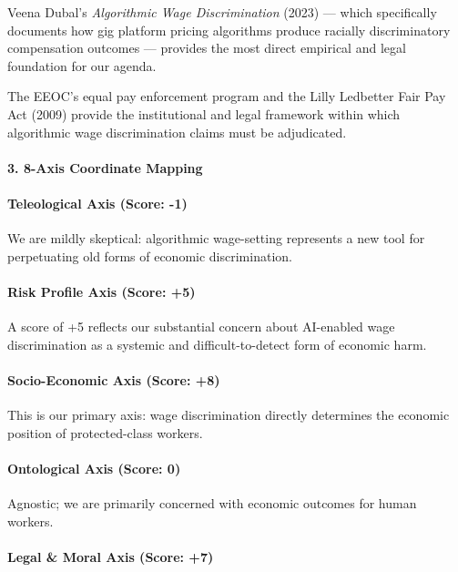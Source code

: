 Veena Dubal's \emph{Algorithmic Wage Discrimination} (2023) --- which
specifically documents how gig platform pricing algorithms produce
racially discriminatory compensation outcomes --- provides the most
direct empirical and legal foundation for our agenda.

The EEOC's equal pay enforcement program and the Lilly Ledbetter Fair
Pay Act (2009) provide the institutional and legal framework within
which algorithmic wage discrimination claims must be adjudicated.

\paragraph{3. 8-Axis Coordinate
Mapping}\label{axis-coordinate-mapping-42}

\paragraph{Teleological Axis (Score:
-1)}\label{teleological-axis-score--1-5}

We are mildly skeptical: algorithmic wage-setting represents a new tool
for perpetuating old forms of economic discrimination.

\paragraph{Risk Profile Axis (Score:
+5)}\label{risk-profile-axis-score-5-4}

A score of +5 reflects our substantial concern about AI-enabled wage
discrimination as a systemic and difficult-to-detect form of economic
harm.

\paragraph{Socio-Economic Axis (Score:
+8)}\label{socio-economic-axis-score-8-4}

This is our primary axis: wage discrimination directly determines the
economic position of protected-class workers.

\paragraph{Ontological Axis (Score:
0)}\label{ontological-axis-score-0-17}

Agnostic; we are primarily concerned with economic outcomes for human
workers.

\paragraph{Legal \& Moral Axis (Score:
+7)}\label{legal-moral-axis-score-7-5}

